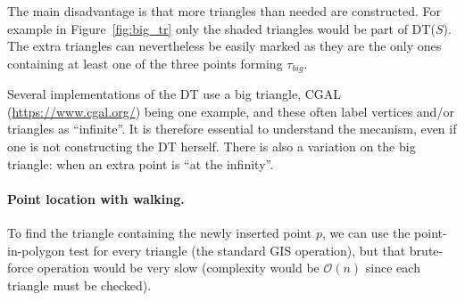 %

The main disadvantage is that more triangles than needed are constructed. 
For example in Figure~\ref{fig:big_tr} only the shaded triangles would be part of DT($S$). 
The extra triangles can nevertheless be easily marked as they are the only ones containing at least one of the three points forming $\tau_{big}$. 

%

\begin{kaobox}[frametitle=\faCog\ How does it work in practice?]
Several implementations of the DT use a big triangle,  CGAL (\url{https://www.cgal.org/}) being one example, and these often label vertices and/or triangles as ``infinite''.
It is therefore essential to understand the mecanism, even if one is not constructing the DT herself.
There is also a variation on the big triangle: when an extra point is ``at the infinity''.
\end{kaobox}


\paragraph{Point location with walking.}%
\label{sec:dtwalk}

To find the triangle containing the newly inserted point $p$, we can use the point-in-polygon test for every triangle (the standard GIS operation), but that brute-force operation would be very slow (complexity would be $\mathcal{O}(n)$ since each triangle must be checked).

